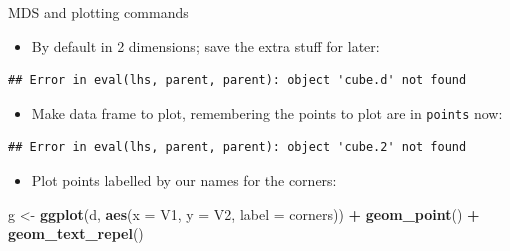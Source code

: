 \documentclass[ignorenonframetext,]{beamer}
\newenvironment{Shaded}{\begin{snugshade}}{\end{snugshade}}
\newcommand{\DataTypeTok}[1]{\textcolor[rgb]{0.13,0.29,0.53}{#1}}
\newcommand{\FloatTok}[1]{\textcolor[rgb]{0.00,0.00,0.81}{#1}}
\newcommand{\KeywordTok}[1]{\textcolor[rgb]{0.13,0.29,0.53}{\textbf{#1}}}
\newcommand{\NormalTok}[1]{#1}
\newcommand{\OperatorTok}[1]{\textcolor[rgb]{0.81,0.36,0.00}{\textbf{#1}}}
\newcommand{\StringTok}[1]{\textcolor[rgb]{0.31,0.60,0.02}{#1}}
\providecommand{\tightlist}{%
  \setlength{\itemsep}{0pt}\setlength{\parskip}{0pt}}
\begin{document}
\begin{frame}[fragile]{MDS and plotting commands}
\protect\hypertarget{mds-and-plotting-commands}{}

\begin{itemize}
\tightlist
\item
  By default in 2 dimensions; save the extra stuff for later:
\end{itemize}

\begin{Shaded}
\end{Shaded}

\begin{verbatim}
## Error in eval(lhs, parent, parent): object 'cube.d' not found
\end{verbatim}

\begin{itemize}
\tightlist
\item
  Make data frame to plot, remembering the points to plot are in
  \texttt{points} now:
\end{itemize}

\begin{Shaded}
\end{Shaded}

\begin{verbatim}
## Error in eval(lhs, parent, parent): object 'cube.2' not found
\end{verbatim}

\begin{itemize}
\tightlist
\item
  Plot points labelled by our names for the corners:
\end{itemize}

\begin{Shaded}
\begin{Highlighting}[]
\NormalTok{g <-}\StringTok{ }\KeywordTok{ggplot}\NormalTok{(d, }\KeywordTok{aes}\NormalTok{(}\DataTypeTok{x =}\NormalTok{ V1, }\DataTypeTok{y =}\NormalTok{ V2, }\DataTypeTok{label =}\NormalTok{ corners)) }\OperatorTok{+}
\StringTok{  }\KeywordTok{geom_point}\NormalTok{() }\OperatorTok{+}\StringTok{ }\KeywordTok{geom_text_repel}\NormalTok{()}
\end{Highlighting}
\end{Shaded}

\end{frame}
\end{document}
